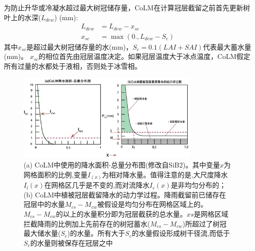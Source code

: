 为防止升华或冷凝水超过最大树冠储存量，CoLM在计算冠层截留之前首先更新树叶上的水深($L_{dew}$) (mm):
\begin{equation}
\begin{aligned}
L_{dew} &= L_{dew}-x_{sc} \\
x_{s c} &= \max\left(0., L_{dew}-S_{c}\right)
\end{aligned}
\end{equation}
其中$x_{sc}$是超过最大树冠储存量的水(mm)，$S_c=0.1\left(LAI+SAI\right)$代表最大蓄水量(mm)。
$x_{sc}$的相位首先由冠层温度决定。如果冠层温度大于冰点温度，CoLM假定所有过量的水都处于液相，否则处于冰雪相。
{
\begin{figure}[htbp]
\centering
\includegraphics[width=0.8\textwidth]{Figures/植被冠层和土壤水分/CoLM冠层截留示意图.jpg}
\caption[(a) CoLM中使用的降水面积-总量分布图；(b) CoLM中植被冠层截留降水的动力学过程]{(a) CoLM中使用的降水面积-总量分布图(修改自SiB2)。其中变量$x$为网格面积的比例,变量$I_{\left(x\right)}$为相对降水量。值得注意的是,大尺度降水$I_l\left(x\right)$在网格区几乎是不变的,而对流降水$I_c\left(x\right)$是非均匀分布的；(b) CoLM中植被冠层截留降水的动力学过程。降雨截留前已储存在冠层中的水量$M_{cs}-M_{cw}$被假设是均匀分布在网格区域上的。$M_{cs}-M_{cw}$的以上的水量积分即为冠层截获的总水量。$xs$是网格区域拦截降雨的比例加上先前存在的树冠蓄水($M_{cs}-M_{cw}$)所超过了树冠最大储水量($S_c$)的水量。所有大于$S_c$的水量假设形成树干径流,而低于$S_c$的水量则被保存在冠层之中}
\label{fig:CoLM冠层截留示意图}
\end{figure}
}

